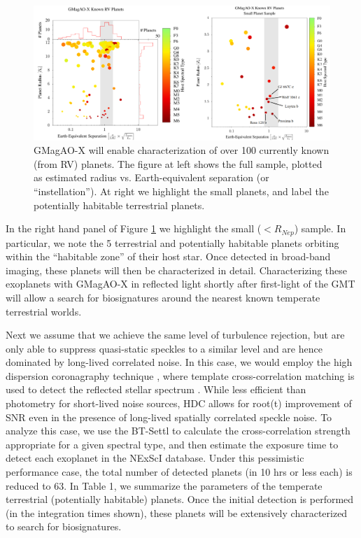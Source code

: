 \documentclass[12pt,preprint]{aastex}
\begin{document}
\begin{figure}[h!]
\centering
\includegraphics[width=6in]{figures/fig3.png}
\caption{GMagAO-X will enable characterization of over 100 currently known (from RV) planets.  The figure at left shows the full sample, plotted as estimated radius vs. Earth-equivalent separation (or “instellation”).  At right we highlight the small planets, and label the potentially habitable terrestrial planets. \label{fig:planets}}
\vspace{-0.3in}
\end{figure}

In the right hand panel of Figure \ref{fig:planets} we highlight the small ($< R_{Nep}$) sample.  In particular, we note the 5 terrestrial and potentially habitable planets orbiting within the “habitable zone” of their host star.  Once detected in broad-band imaging, these planets will then be characterized in detail.  Characterizing these exoplanets with GMagAO-X in reflected light shortly after first-light of the GMT will allow a search for biosignatures around the nearest known temperate terrestrial worlds.
   
Next we assume that we achieve the same level of turbulence rejection, but are only able to suppress quasi-static speckles to a similar level and are hence dominated by long-lived correlated noise.  In this case, we would employ the high dispersion coronagraphy technique \citep[HDC,][]{2017ApJ...838...92M}, where template cross-correlation matching is used to detect the reflected stellar spectrum \citep{2017A&A...599A..16L}.  While less efficient than photometry for short-lived noise sources, HDC allows for root(t) improvement of SNR even in the presence of long-lived spatially correlated speckle noise.  To analyze this case, we use the BT-Settl \citep{2014IAUS..299..271A} to calculate the cross-correlation strength appropriate for a given spectral type, and then estimate the exposure time to detect each exoplanet in the NExScI database. Under this pessimistic performance case, the total number of detected planets (in 10 hrs or less each) is reduced to 63.
In Table 1, we summarize the parameters of the temperate terrestrial (potentially habitable) planets.  Once the initial detection is performed (in the integration times shown), these planets will be extensively characterized to search for biosignatures.
\end{document}
